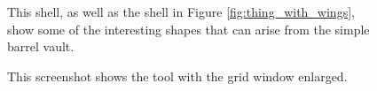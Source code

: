 \documentclass{thesis}
\begin{document}
\begin{figure}
\caption[Modified barrel vault]{This shell, as well as the shell in Figure \ref{fig:thing_with_wings}, show some of the
interesting shapes that can arise from the simple barrel vault.}
\label{fig:countercurve}
\end{figure}

\begin{figure}
\caption[Zoomed in grid]{This screenshot shows the tool with the grid window enlarged.}
\label{fig:big_grid}
\end{figure}
\end{document}
